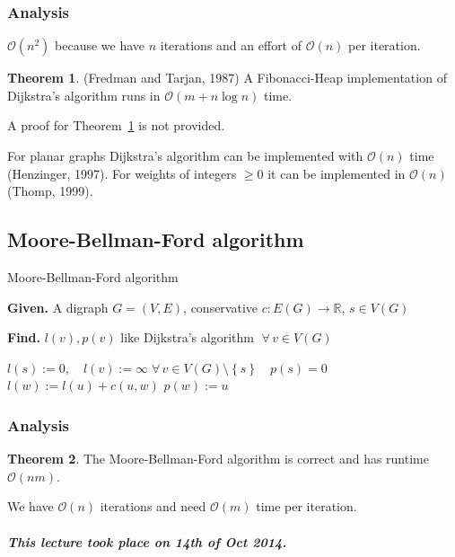\documentclass[a4paper]{article}
\theoremstyle{definition}
\newtheorem{theorem}{Theorem}
\newcommand{\set}[1]{\left\{#1\right\}}
\newcommand{\given}[1]{\textbf{Given.} #1\par}
\newcommand{\find}[1]{\textbf{Find.} #1\par}
\newcommand{\dateref}[1]{\paragraph{\textit{This lecture took place on #1.}}}
\newcommand{\fall}{\;\forall\,}
\newcommand{\noproof}[1]{A proof for Theorem~\ref{#1} is not provided.}
\begin{document}
\subsubsection{Analysis}
%
$\mathcal{O}(n^2)$ because we have $n$ iterations and an effort of $\mathcal{O}(n)$ per iteration.

\begin{theorem}\label{satz-3.3}
  (Fredman and Tarjan, 1987)
  A Fibonacci-Heap implementation of Dijkstra's algorithm runs in $\mathcal{O}(m + n\log{n})$ time.
\end{theorem}

\noproof{satz-3.3}

For planar graphs Dijkstra's algorithm can be implemented with $\mathcal{O}(n)$ time (Henzinger, 1997). For weights of integers $\geq 0$ it can be implemented in $\mathcal{O}(n)$ (Thomp, 1999).

\subsection{Moore-Bellman-Ford algorithm}
%
\begin{algorithm}
  \caption{Moore-Bellman-Ford algorithm}
  \label{mbf-algo}
  \given{A digraph $G=(V, E)$, conservative $c: E(G) \rightarrow \mathbb{R}$, $s \in V(G)$}
  \find{$l(v), p(v)$ like Dijkstra's algorithm $\fall v \in V(G)$}
\begin{algorithmic}[1]
  \State $l(s) := 0, \quad l(v) := \infty \fall v \in V(G) \setminus \set{s} \quad p(s) = 0$
        \State $l(w) := l(u) + c(u, w)$
        \State $p(w) := u$
      \EndIf
    \EndFor
  \EndFor
\end{algorithmic}
\end{algorithm}

\subsubsection{Analysis}

\begin{theorem}\label{satz-3.4}
  The Moore-Bellman-Ford algorithm is correct and has runtime $\mathcal{O}(nm)$.
\end{theorem}

We have $\mathcal{O}(n)$ iterations and need $\mathcal{O}(m)$ time per iteration.

\dateref{14th of Oct 2014}
\end{document}
